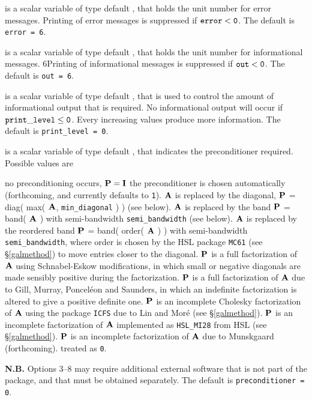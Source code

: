 \documentclass{galahad}
\begin{document}
\begin{description}

 is a scalar variable of type default \integer, that holds the
unit number for error messages.
Printing of error messages is suppressed if ${\tt error} < {\tt 0}$.
The default is {\tt error = 6}.

 is a scalar variable of type default \integer, that holds the
unit number for informational messages.
6Printing of informational messages is suppressed if ${\tt out} < {\tt 0}$.
The default is {\tt out = 6}.

 is a scalar variable of type default \integer,
that is used
to control the amount of informational output that is required. No
informational output will occur if ${\tt print\_level} \leq {\tt 0}$. 
Every increasing values produce more information.
The default is {\tt print\_level = 0}.

 is a scalar variable of type default \integer, that 
indicates the preconditioner required. Possible values are
\begin{description}
 no preconditioning occurs, ${\mathbf{P}} = {\mathbf{I}}$
  the preconditioner is chosen automatically (forthcoming,
         and currently defaults to {\tt 1}).
  ${\mathbf{A}}$ is replaced by the diagonal, 
         ${\mathbf{P}}$ = diag( max( ${\mathbf{A}}$, {\tt min\_diagonal} ) ) (see below).
  ${\mathbf{A}}$ is replaced by the band 
         ${\mathbf{P}}$ = band( ${\mathbf{A}}$ ) with semi-bandwidth {\tt semi\_bandwidth}
         (see below).
  ${\mathbf{A}}$ is replaced by the reordered band 
         ${\mathbf{P}}$ = band( order( ${\mathbf{A}}$ ) ) with semi-bandwidth 
         {\tt semi\_bandwidth}, where order is chosen by the HSL package
         {\tt MC61} (see \S\ref{galmethod}) to move entries closer to 
         the diagonal.
  ${\mathbf{P}}$ is a full factorization of ${\mathbf{A}}$ using Schnabel-Eskow 
         modifications, in which small or negative diagonals are
         made sensibly positive during the factorization.
  ${\mathbf{P}}$ is a full factorization of ${\mathbf{A}}$  due to Gill, Murray, 
         Poncel\'{e}on and Saunders, in which an indefinite factorization 
         is altered to give a positive definite one.
  ${\mathbf{P}}$ is an incomplete Cholesky factorization of ${\mathbf{A}}$ using the 
         package {\tt ICFS} due to Lin and Mor\'{e} (see \S\ref{galmethod}).
  ${\mathbf{P}}$ is an incomplete factorization of ${\mathbf{A}}$ implemented 
         as {\tt HSL\_MI28} from HSL (see \S\ref{galmethod}).
  ${\mathbf{P}}$ is an incomplete factorization of ${\mathbf{A}}$ due 
         to Munskgaard (forthcoming).
 treated as {\tt 0}.
\end{description}
{\bf N.B.} Options 3--8 may require additional external software that 
is not part of the package, and that must be obtained separately.
The default is {\tt preconditioner = 0}.


\end{description}
\end{document}
